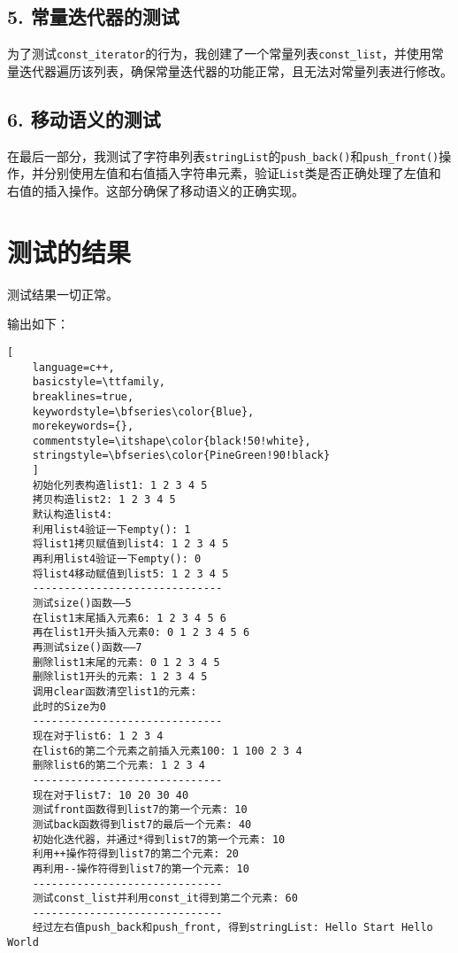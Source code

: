 \documentclass[UTF8]{ctexart}
\begin{document}
\subsection*{5. 常量迭代器的测试}
为了测试\texttt{const\_iterator}的行为，我创建了一个常量列表\texttt{const\_list}，并使用常量迭代器遍历该列表，确保常量迭代器的功能正常，且无法对常量列表进行修改。

\subsection*{6. 移动语义的测试}
在最后一部分，我测试了字符串列表\texttt{stringList}的\texttt{push\_back()}和\texttt{push\_front()}操作，并分别使用左值和右值插入字符串元素，验证\texttt{List}类是否正确处理了左值和右值的插入操作。这部分确保了移动语义的正确实现。

\section{测试的结果}

测试结果一切正常。

输出如下：
\begin{lstlisting}[ 
    language=c++,
    basicstyle=\ttfamily,
    breaklines=true,
    keywordstyle=\bfseries\color{Blue}, 
    morekeywords={}, 
    commentstyle=\itshape\color{black!50!white},
    stringstyle=\bfseries\color{PineGreen!90!black} 
    ]
    初始化列表构造list1: 1 2 3 4 5 
    拷贝构造list2: 1 2 3 4 5 
    默认构造list4: 
    利用list4验证一下empty(): 1
    将list1拷贝赋值到list4: 1 2 3 4 5 
    再利用list4验证一下empty(): 0
    将list4移动赋值到list5: 1 2 3 4 5 
    ------------------------------
    测试size()函数——5
    在list1末尾插入元素6: 1 2 3 4 5 6 
    再在list1开头插入元素0: 0 1 2 3 4 5 6 
    再测试size()函数——7
    删除list1末尾的元素: 0 1 2 3 4 5 
    删除list1开头的元素: 1 2 3 4 5 
    调用clear函数清空list1的元素: 
    此时的Size为0
    ------------------------------
    现在对于list6: 1 2 3 4 
    在list6的第二个元素之前插入元素100: 1 100 2 3 4 
    删除list6的第二个元素: 1 2 3 4 
    ------------------------------
    现在对于list7: 10 20 30 40 
    测试front函数得到list7的第一个元素: 10
    测试back函数得到list7的最后一个元素: 40
    初始化迭代器，并通过*得到list7的第一个元素: 10
    利用++操作符得到list7的第二个元素: 20
    再利用--操作符得到list7的第一个元素: 10
    ------------------------------
    测试const_list并利用const_it得到第二个元素: 60
    ------------------------------
    经过左右值push_back和push_front, 得到stringList: Hello Start Hello World
\end{lstlisting}
\end{document}

